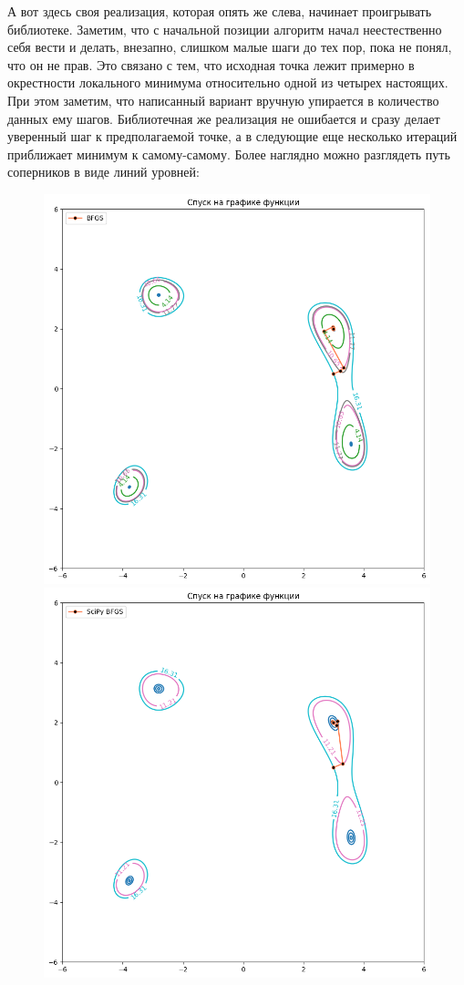 \documentclass[12pt, a4paper, oneside, final]{article}
\begin{document}
	А вот здесь своя реализация, которая опять же слева, начинает проигрывать библиотеке.
	Заметим, что с начальной позиции алгоритм начал неестественно себя вести и делать, внезапно, слишком малые шаги до тех пор, пока не понял, что он не прав.
	Это связано с тем, что исходная точка лежит примерно в окрестности локального минимума относительно одной из четырех настоящих.
	При этом заметим, что написанный вариант вручную упирается в количество данных ему шагов.
	Библиотечная же реализация не ошибается и сразу делает уверенный шаг к предполагаемой точке, а в следующие еще несколько итераций приближает минимум к самому-самому.
	Более наглядно можно разглядеть путь соперников в виде линий уровней:
	\begin{figure}[H]
		\centering
		\includegraphics[scale = 0.35]{Image/T2A_F2_BFGS_LEVELS.png}
		\includegraphics[scale = 0.35]{Image/T2A_F2_scipy_BFGS_LEVELS.png}

\end{figure}
\end{document}

